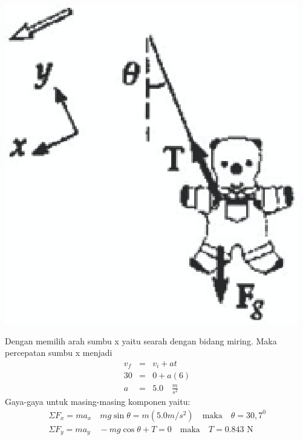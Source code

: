 \begin{solution}
\begin{center}
\includegraphics [scale=0.3]{./latex/eps/1_5_7_image_2.eps}
\end{center}
Dengan memilih arah sumbu x yaitu searah dengan bidang miring. Maka percepatan sumbu x menjadi
\begin{eqnarray*}
v_{f}&=&v_{i}+at \\
30 &=&0 + a(6) \\
a&=&5.0 \quad \textrm{$\frac{m}{s^{2}}$}
\end{eqnarray*}
Gaya-gaya untuk masing-masing komponen yaitu:
\begin{eqnarray*}
\Sigma F_{x}=ma_{x} \quad mg\sin\theta=m(5.0 m/s^{2}) \quad \textrm{maka} \quad \theta=30,7^{0} \\
\Sigma F_{y}=ma_{y} \quad -mg\cos\theta+T=0 \quad \textrm{maka} \quad T=0.843 \textrm{ N}
\end{eqnarray*}
\end{solution}
